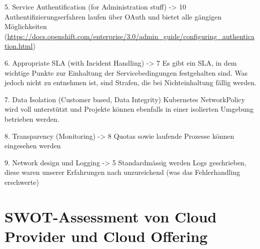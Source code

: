 \documentclass[12pt,a4paper]{article}
\begin{document}
5. Service Authentification (for Administration stuff) -> 10
Authentifizierungserfahren laufen über OAuth und bietet alle gängigen Möglichkeiten (\url{https://docs.openshift.com/enterprise/3.0/admin_guide/configuring_authentication.html})


6. Appropriate SLA (with Incident Handling) -> 7
Es gibt ein SLA, in dem wichtige Punkte zur Einhaltung der Servicebedingungen festgehalten sind. Was jedoch nicht zu entnehmen ist, sind Strafen, die bei Nichteinhaltung fällig werden.


7. Data Isolation (Customer based, Data Integrity)
Kubernetes NetworkPolicy wird voll unterstützt und Projekte können ebenfalls in einer isolierten Umgebung betrieben werden.


8. Transparency (Monitoring) -> 8
Quotas sowie laufende Prozesse können eingesehen werden


9. Network design und Logging -> 5
Standardmässig werden Logs geschrieben, diese waren unserer Erfahrungen nach unzureichend (was das Fehlerhandling erschwerte)


\section{SWOT-Assessment von Cloud Provider und Cloud Offering}
\end{document}
